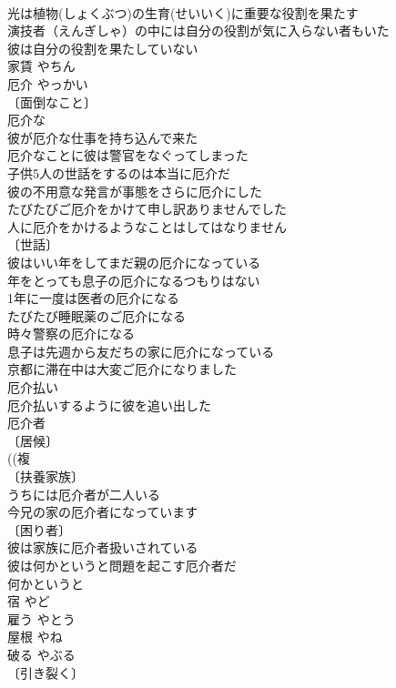\documentclass[8pt]{extreport}
\begin{document}
\begin{CJK}{UTF8}{min}
\\	光は植物(しょくぶつ)の生育(せいいく)に重要な役割を果たす 
\\	演技者（えんぎしゃ）の中には自分の役割が気に入らない者もいた 
\\	彼は自分の役割を果たしていない 
\\	家賃	やちん	
\\	厄介	やっかい	
\\	〔面倒なこと〕
\\	厄介な 
\\	彼が厄介な仕事を持ち込んで来た 
\\	厄介なことに彼は警官をなぐってしまった 
\\	子供5人の世話をするのは本当に厄介だ 
\\	彼の不用意な発言が事態をさらに厄介にした 
\\	たびたびご厄介をかけて申し訳ありませんでした 
\\	人に厄介をかけるようなことはしてはなりません 
\\	〔世話〕 
\\	彼はいい年をしてまだ親の厄介になっている 
\\	年をとっても息子の厄介になるつもりはない 
\\	1年に一度は医者の厄介になる 
\\	たびたび睡眠薬のご厄介になる 
\\	時々警察の厄介になる 
\\	息子は先週から友だちの家に厄介になっている 
\\	京都に滞在中は大変ご厄介になりました 
\\	厄介払い　
\\	厄介払いするように彼を追い出した 
\\	厄介者 
\\	〔居候〕
\\	((複
\\	〔扶養家族〕
\\	うちには厄介者が二人いる 
\\	今兄の家の厄介者になっています 
\\	〔困り者〕
\\	彼は家族に厄介者扱いされている 
\\	彼は何かというと問題を起こす厄介者だ 
\\	何かというと 
\\	宿	やど	
\\	雇う	やとう	
\\	屋根	やね	
\\	破る	やぶる	
\\	〔引き裂く〕

\end{CJK}
\end{document}
